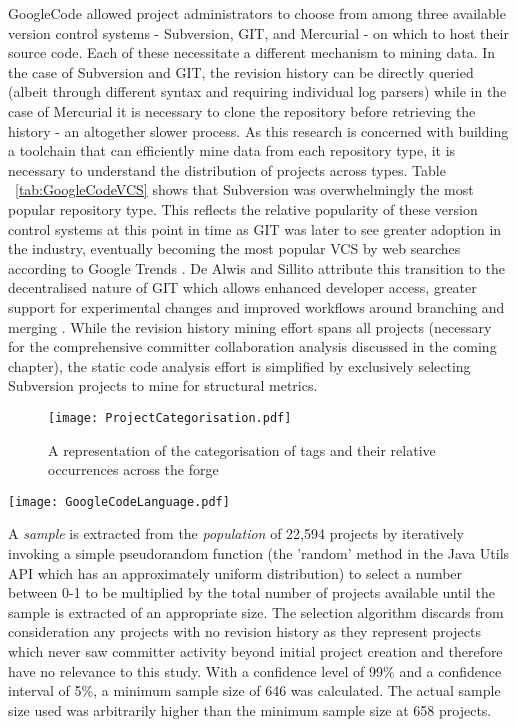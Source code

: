 GoogleCode allowed project administrators to choose from among three available version control systems - Subversion, GIT, and Mercurial - on which to host their source code. Each of these necessitate a different mechanism to mining data. In the case of Subversion and GIT, the revision history can be directly queried (albeit through different syntax and requiring individual log parsers) while in the case of Mercurial it is necessary to clone the repository before retrieving the history - an altogether slower process. As this research is concerned with building a toolchain that can efficiently mine data from each repository type, it is necessary to understand the distribution of projects across types. Table ~\ref{tab:GoogleCodeVCS} shows that Subversion was overwhelmingly the most popular repository type. This reflects the relative popularity of these version control systems at this point in time as GIT was later to see greater adoption in the industry, eventually becoming the most popular VCS by web searches according to Google Trends \citep{rhodecode}. De Alwis and Sillito attribute this transition to the decentralised nature of GIT which allows enhanced developer access, greater support for experimental changes and improved workflows around branching and merging \citep{de2009software}. While the revision history mining effort spans all projects (necessary for the comprehensive committer collaboration analysis discussed in the coming chapter), the static code analysis effort is simplified by exclusively selecting Subversion projects to mine for structural metrics.

\begin{figure}[htbp!] 
\centering    
\texttt{[image: ProjectCategorisation.pdf]}
\caption{A representation of the categorisation of tags and their relative occurrences across the forge}
\label{fig:ProjectCategorisation}
\end{figure}

\begin{table}
\centering 
{}
\begin{tabular}
 \centering 
 \texttt{[image: GoogleCodeLanguage.pdf]}
 \label{tab:GoogleCodeLanguage}
\end{tabular}
\end{table}

A \textit{sample} is extracted from the \textit{population} of 22,594 projects by iteratively invoking a simple pseudorandom function (the 'random' method in the Java Utils API which has an approximately uniform distribution) to select a number between 0-1 to be multiplied by the total number of projects available until the sample is extracted of an appropriate size. The selection algorithm discards from consideration any projects with no revision history as they represent projects which never saw committer activity beyond initial project creation and therefore have no relevance to this study. With a confidence level of 99\% and a confidence interval of 5\%, a minimum sample size of 646 was calculated. The actual sample size used was arbitrarily higher than the minimum sample size at 658 projects. 

